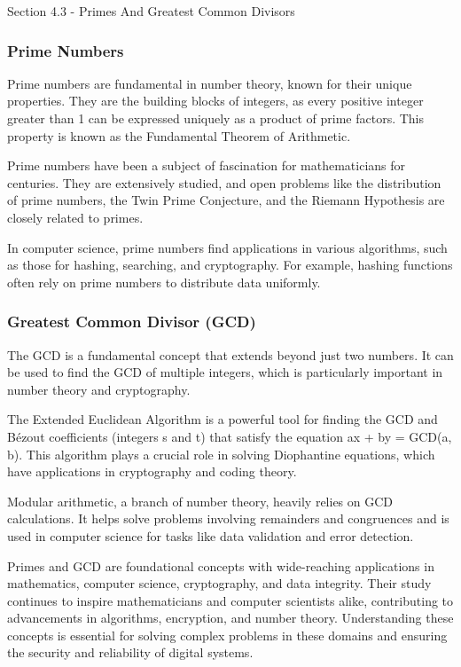 \begin{notes}{Section 4.3 - Primes And Greatest Common Divisors}
    \subsubsection*{Prime Numbers}
    Prime numbers are fundamental in number theory, known for their unique properties. They are the building blocks of integers, as every positive integer greater than 1 can be expressed uniquely as a 
    product of prime factors. This property is known as the Fundamental Theorem of Arithmetic.

    Prime numbers have been a subject of fascination for mathematicians for centuries. They are extensively studied, and open problems like the distribution of prime numbers, the Twin Prime Conjecture, 
    and the Riemann Hypothesis are closely related to primes.

    In computer science, prime numbers find applications in various algorithms, such as those for hashing, searching, and cryptography. For example, hashing functions often rely on prime numbers to 
    distribute data uniformly.

    \subsubsection*{Greatest Common Divisor (GCD)}
    The GCD is a fundamental concept that extends beyond just two numbers. It can be used to find the GCD of multiple integers, which is particularly important in number theory and cryptography.

    The Extended Euclidean Algorithm is a powerful tool for finding the GCD and Bézout coefficients (integers s and t) that satisfy the equation ax + by = GCD(a, b). This algorithm plays a crucial 
    role in solving Diophantine equations, which have applications in cryptography and coding theory.

    Modular arithmetic, a branch of number theory, heavily relies on GCD calculations. It helps solve problems involving remainders and congruences and is used in computer science for tasks like data 
    validation and error detection.

    Primes and GCD are foundational concepts with wide-reaching applications in mathematics, computer science, cryptography, and data integrity. Their study continues to inspire mathematicians and 
    computer scientists alike, contributing to advancements in algorithms, encryption, and number theory. Understanding these concepts is essential for solving complex problems in these domains and 
    ensuring the security and reliability of digital systems.


\end{notes}

